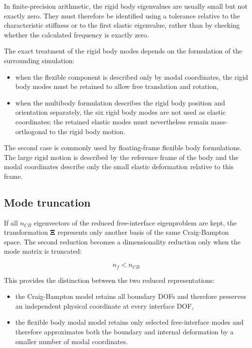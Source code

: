 In finite-precision arithmetic, the rigid body eigenvalues are usually small but
not exactly zero. They must therefore be identified using a tolerance relative to
the characteristic stiffness or to the first elastic eigenvalue, rather than by
checking whether the calculated frequency is exactly zero.

The exact treatment of the rigid body modes depends on the formulation of the
surrounding simulation:

\begin{itemize}
    \item when the flexible component is described only by modal coordinates, the
          rigid body modes must be retained to allow free translation and rotation,
    \item when the multibody formulation describes the rigid body position and
          orientation separately, the six rigid body modes are not used as elastic
          coordinates; the retained elastic modes must nevertheless remain
          mass-orthogonal to the rigid body motion.
\end{itemize}

The second case is commonly used by floating-frame flexible body formulations. The
large rigid motion is described by the reference frame of the body and the modal
coordinates describe only the small elastic deformation relative to this frame.

\subsection{Mode truncation}

If all $ n_{CB} $ eigenvectors of the reduced free-interface eigenproblem are kept,
the transformation $ \pmb{\Xi} $ represents only another basis of the same
Craig-Bampton space. The second reduction becomes a dimensionality reduction only
when the mode matrix is truncated:

\begin{equation}
    n_f < n_{CB}
\end{equation}

This provides the distinction between the two reduced representations:

\begin{itemize}
    \item the Craig-Bampton model retains all boundary DOFs and therefore preserves
          an independent physical coordinate at every interface DOF,
    \item the flexible body modal model retains only selected free-interface modes
          and therefore approximates both the boundary and internal deformation by
          a smaller number of modal coordinates.
\end{itemize}

